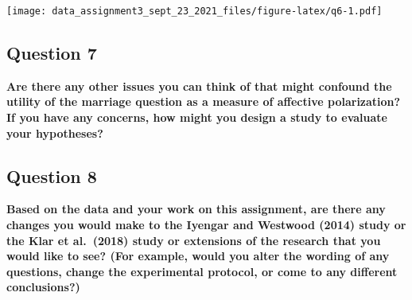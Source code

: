 \documentclass[
]{article}
\begin{document}
\texttt{[image: data\_assignment3\_sept\_23\_2021\_files/figure-latex/q6-1.pdf]}

\hypertarget{question-7}{%
\subsection{Question 7}\label{question-7}}

\textbf{Are there any other issues you can think of that might confound
the utility of the marriage question as a measure of affective
polarization? If you have any concerns, how might you design a study to
evaluate your hypotheses?}

\hypertarget{question-8}{%
\subsection{Question 8}\label{question-8}}

\textbf{Based on the data and your work on this assignment, are there
any changes you would make to the Iyengar and Westwood (2014) study or
the Klar et al.~(2018) study or extensions of the research that you
would like to see? (For example, would you alter the wording of any
questions, change the experimental protocol, or come to any different
conclusions?)}
\end{document}
